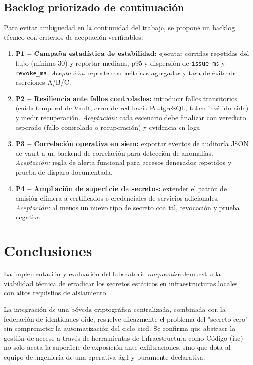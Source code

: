 \documentclass[runningheads]{llncs}
\begin{document}
\subsection{Backlog priorizado de continuación}
Para evitar ambiguedad en la continuidad del trabajo, se propone un backlog técnico con criterios de aceptación verificables:
\begin{enumerate}
    \item \textbf{P1 -- Campaña estadística de estabilidad:} ejecutar corridas repetidas del flujo (mínimo 30) y reportar mediana, p95 y dispersión de \texttt{issue\_ms} y \texttt{revoke\_ms}. \textit{Aceptación:} reporte con métricas agregadas y tasa de éxito de aserciones A/B/C.
    \item \textbf{P2 -- Resiliencia ante fallos controlados:} introducir fallos transitorios (caída temporal de Vault, error de red hacia PostgreSQL, token inválido \gls{oidc}) y medir recuperación. \textit{Aceptación:} cada escenario debe finalizar con veredicto esperado (fallo controlado o recuperación) y evidencia en logs.
    \item \textbf{P3 -- Correlación operativa en \gls{siem}:} exportar eventos de auditoría JSON de \gls{vault} a un backend de correlación para detección de anomalías. \textit{Aceptación:} regla de alerta funcional para accesos denegados repetidos y prueba de disparo documentada.
    \item \textbf{P4 -- Ampliación de superficie de secretos:} extender el patrón de emisión efímera a certificados o credenciales de servicios adicionales. \textit{Aceptación:} al menos un nuevo tipo de secreto con \gls{ttl}, revocación y prueba negativa.
\end{enumerate}

\section{Conclusiones}
La implementación y evaluación del laboratorio \textit{on-premise} demuestra la viabilidad técnica de erradicar los secretos estáticos en infraestructuras locales con altos requisitos de aislamiento.

La integración de una bóveda criptográfica centralizada, combinada con la federación de identidades \gls{oidc}, resuelve eficazmente el problema del "secreto cero" sin comprometer la automatización del ciclo \gls{cicd}. Se confirma que abstraer la gestión de acceso a través de herramientas de Infraestructura como Código (\gls{iac}) no solo acota la superficie de exposición ante exfiltraciones, sino que dota al equipo de ingeniería de una operativa ágil y puramente declarativa.
\end{document}

